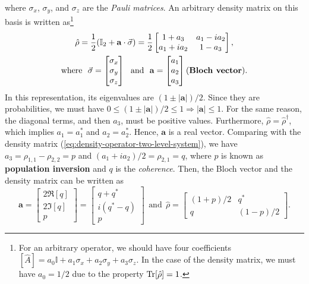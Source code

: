 where $ \sigma_x $, $ \sigma_y $, and $ \sigma_z $ are the \textit{Pauli matrices}. An arbitrary density matrix on this basis is written as\footnote{For an arbitrary operator, we should have four coefficients $ [\hat{A}] = a_0 \mathbb{I} + a_1 \sigma_x + a_2 \sigma_y + a_3 \sigma_z $. In the case of the density matrix, we must have $ a_0 = 1/2 $ due to the property $ \Tr[\hat{\rho}] = 1 $.}
\begin{gather}
	\hat{\rho} = \frac{1}{2}(\mathbb{I}_2 + \mathbf{a} \cdot \vec{\sigma}) = \frac{1}{2}\left[ \begin{matrix} 1 + a_3 & a_1 - ia_2 \\ a_1 + i a_2 & 1 - a_3 \end{matrix} \right], 
	\label{eq:density-matrix-on-Pauli-basis}
	\\
	\textrm{where}\ \ \vec{\sigma} = \left[ \begin{matrix} \sigma_x \\ \sigma_y \\ \sigma_z \end{matrix} \right]\ \ \textrm{and}\ \ \mathbf{a} = \left[ \begin{matrix} a_1 \\ a_2 \\ a_3 \end{matrix} \right] \textrm{(\textbf{Bloch vector})}.
	\label{eq:Bloch-vector}
\end{gather}
In this representation, its eigenvalues are $ (1 \pm |\mathbf{a}|)/2$. Since they are probabilities, we must have $ 0 \leq (1 \pm |\mathbf{a}|)/2 \leq 1 \Rightarrow |\mathbf{a}| \leq 1 $. For the same reason, the diagonal terms, and then $ a_3 $, must be positive values. Furthermore, $ \hat{\rho} = \hat{\rho}^{\dagger} $, which implies $ a_1 = a_1^* $ and $ a_2 = a_2^* $. Hence, $ \mathbf{a} $ is a real vector. Comparing with the density matrix (\ref{eq:density-operator-two-level-system}), we have $ a_3 = \rho_{1,1} - \rho_{2,2} = p $ and $ (a_1 + i a_2) / 2 = \rho_{2,1} = q $, where $ p $ is known as \textbf{population inversion} and $ q $ is the \textit{coherence}. Then, the Bloch vector and the density matrix can be written as
\begin{equation}
	\mathbf{a} = \left[ \begin{matrix} 2\Re[q] \\ 2\Im[q] \\ p \end{matrix} \right] = \left[ \begin{matrix} q + q^* \\ i(q^* - q) \\ p \end{matrix} \right]\ \ \textrm{and}\ \ \hat{\rho} = \left[ \begin{matrix} (1 + p)/2 & q^{*} \\ q & (1 - p)/2 \end{matrix} \right].
	\label{eq:density-matrix-two-level-system}
\end{equation}
